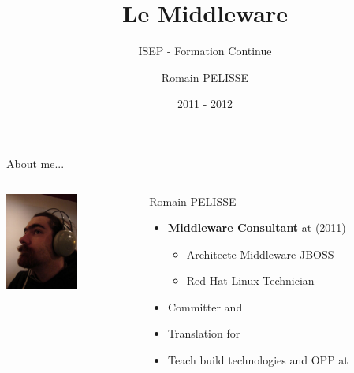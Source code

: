 \documentclass[handout]{beamer}
\title{Le Middleware}
\subtitle{ISEP - Formation Continue}
\author{Romain PELISSE}
\institute{Red Hat GmbH}
\date{2011 - 2012}
\begin{document}
  \begin{frame}
    \titlepage
  \end{frame}

  \begin{frame}{About me...}
    \begin{columns}

    \begin{column}[l]{.3\textwidth}
      \begin{center}
        \includegraphics[height=120px]{../img/rpe.jpg}
      \end{center}
    \end{column}

    \begin{column}[r]{.7\textwidth}
      \begin{block}{Romain PELISSE}
        \begin{itemize}
          \item \textbf{Middleware Consultant} at  (2011)
          \begin{itemize}
            \item Architecte Middleware JBOSS
            \item Red Hat Linux Technician
          \end{itemize}
          \item Committer  and 
          \item Translation for 
          \item Teach build technologies and OPP at 
        \end{itemize}
      \end{block}
    \end{column}
   \end{columns}
 \end{frame}

 
 
\end{document}
